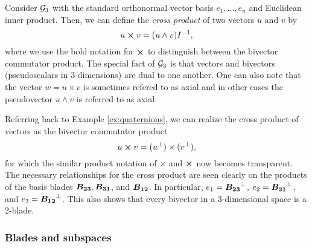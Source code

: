 \begin{example}
\label{ex:cross_product}
Consider $\mathcal{G}_3$ with the standard orthonormal vector basis $e_1,\dots,e_n$ and Euclidean inner product.  Then, we can define the \emph{cross product} of two vectors $u$ and $v$ by
\[
u \boldsymbol{\times} v = (u\wedge v)I^{-1},
\]
where we use the bold notation for $\boldsymbol{\times}$ to distinguish between the bivector commutator product. The special fact of $\mathcal{G}_3$ is that vectors and bivectors (pseudoscalars in 3-dimensions) are dual to one another. One can also note that the vector $w=u\times v$ is sometimes refered to as axial and in other cases the pseudovector $u\wedge v$ is referred to as axial. 

Referring back to Example \ref{ex:quaternions}, we can realize the cross product of vectors as the bivector commutator product
\[
u \boldsymbol{\times} v = (u^\perp)\times (v^\perp), 
\]
for which the similar product notation of $\times$ and $\boldsymbol{\times}$ now becomes transparent. The necessary relationships for the cross product are seen clearly on the products of the basis blades $\boldsymbol{B_{23}}, \boldsymbol{B_{31}}$, and $\boldsymbol{B_{12}}$. In particular, $e_1 = \boldsymbol{B_{23}}^\perp$, $e_2 = \boldsymbol{B_{31}}^\perp$, and $e_3 = \boldsymbol{B_{12}}^\perp$. This also shows that every bivector in a 3-dimensional space is a 2-blade.
\end{example}


\subsubsection{Blades and subspaces}

